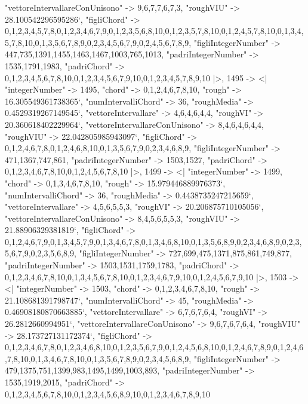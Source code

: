 \documentclass[
]{article}
\begin{document}
\begin{DatasetVerbatim}
    "vettoreIntervallareConUnisono" -> {9,6,7,7,6,7,3},
    "roughVIU" -> 28.100542296595286`,
    "figliChord" -> {{0,1,2,3,4,5,7,8},{0,1,2,3,4,6,7,9},{0,1,2,3,5,6,8,10},{0,1,2,3,5,7,8,10},{0,1,2,4,5,7,8,10},{0,1,3,4,5,7,8,10},{0,1,3,5,6,7,8,9},{0,2,3,4,5,6,7,9},{0,2,4,5,6,7,8,9}},
    "figliIntegerNumber" -> {447,735,1391,1455,1463,1467,1003,765,1013},
    "padriIntegerNumber" -> {1535,1791,1983},
    "padriChord" -> {{0,1,2,3,4,5,6,7,8,10},{0,1,2,3,4,5,6,7,9,10},{0,1,2,3,4,5,7,8,9,10}}
  |>,
  1495 -> <|
    "integerNumber" -> 1495,
    "chord" -> {0,1,2,4,6,7,8,10},
    "rough" -> 16.305549361738365`,
    "numIntervalliChord" -> 36,
    "roughMedia" -> 0.4529319267149545`,
    "vettoreIntervallare" -> {4,6,4,6,4,4},
    "roughVI" -> 20.360618402229964`,
    "vettoreIntervallareConUnisono" -> {8,4,6,4,6,4,4},
    "roughVIU" -> 22.042805985943097`,
    "figliChord" -> {{0,1,2,4,6,7,8},{0,1,2,4,6,8,10},{0,1,3,5,6,7,9},{0,2,3,4,6,8,9}},
    "figliIntegerNumber" -> {471,1367,747,861},
    "padriIntegerNumber" -> {1503,1527},
    "padriChord" -> {{0,1,2,3,4,6,7,8,10},{0,1,2,4,5,6,7,8,10}}
  |>,
  1499 -> <|
    "integerNumber" -> 1499,
    "chord" -> {0,1,3,4,6,7,8,10},
    "rough" -> 15.979446889976373`,
    "numIntervalliChord" -> 36,
    "roughMedia" -> 0.4438735247215659`,
    "vettoreIntervallare" -> {4,5,6,5,5,3},
    "roughVI" -> 20.206875710105056`,
    "vettoreIntervallareConUnisono" -> {8,4,5,6,5,5,3},
    "roughVIU" -> 21.88906329381819`,
    "figliChord" -> {{0,1,2,4,6,7,9},{0,1,3,4,5,7,9},{0,1,3,4,6,7,8},{0,1,3,4,6,8,10},{0,1,3,5,6,8,9},{0,2,3,4,6,8,9},{0,2,3,5,6,7,9},{0,2,3,5,6,8,9}},
    "figliIntegerNumber" -> {727,699,475,1371,875,861,749,877},
    "padriIntegerNumber" -> {1503,1531,1759,1783},
    "padriChord" -> {{0,1,2,3,4,6,7,8,10},{0,1,3,4,5,6,7,8,10},{0,1,2,3,4,6,7,9,10},{0,1,2,4,5,6,7,9,10}}
  |>,
  1503 -> <|
    "integerNumber" -> 1503,
    "chord" -> {0,1,2,3,4,6,7,8,10},
    "rough" -> 21.108681391798747`,
    "numIntervalliChord" -> 45,
    "roughMedia" -> 0.46908180870663885`,
    "vettoreIntervallare" -> {6,7,6,7,6,4},
    "roughVI" -> 26.2812660994951`,
    "vettoreIntervallareConUnisono" -> {9,6,7,6,7,6,4},
    "roughVIU" -> 28.173727131172374`,
    "figliChord" -> {{0,1,2,3,4,6,7,8},{0,1,2,3,4,6,8,10},{0,1,2,3,5,6,7,9},{0,1,2,4,5,6,8,10},{0,1,2,4,6,7,8,9},{0,1,2,4,6,7,8,10},{0,1,3,4,6,7,8,10},{0,1,3,5,6,7,8,9},{0,2,3,4,5,6,8,9}},
    "figliIntegerNumber" -> {479,1375,751,1399,983,1495,1499,1003,893},
    "padriIntegerNumber" -> {1535,1919,2015},
    "padriChord" -> {{0,1,2,3,4,5,6,7,8,10},{0,1,2,3,4,5,6,8,9,10},{0,1,2,3,4,6,7,8,9,10}}

\end{DatasetVerbatim}
\end{document}
